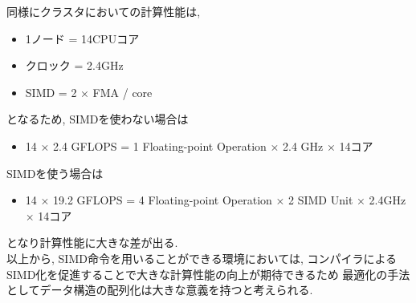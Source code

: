 同様にクラスタにおいての計算性能は,\\
\begin{itemize}
  \item 1ノード = 14CPUコア
  \item クロック = 2.4GHz
  \item SIMD = 2 × FMA / core
\end{itemize}
となるため, SIMDを使わない場合は\\
\begin{itemize}
  \item 14 × 2.4 GFLOPS = 1 Floating-point Operation × 2.4 GHz × 14コア
\end{itemize}
SIMDを使う場合は\\
\begin{itemize}
  \item 14 × 19.2 GFLOPS = 4 Floating-point Operation × 2 SIMD Unit × 2.4GHz × 14コア
\end{itemize}
となり計算性能に大きな差が出る.\\

以上から, SIMD命令を用いることができる環境においては, コンパイラによるSIMD化を促進することで大きな計算性能の向上が期待できるため
最適化の手法としてデータ構造の配列化は大きな意義を持つと考えられる.
